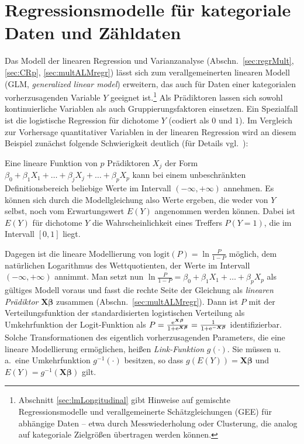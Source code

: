 \chapter{Regressionsmodelle für kategoriale Daten und Zähldaten}
\label{sec:glm}

Das Modell der linearen Regression und Varianzanalyse (Abschn.\ \ref{sec:regrMult}, \ref{sec:CRp}, \ref{sec:multALMregr}) lässt sich zum verallgemeinerten linearen Modell (GLM, \emph{generalized linear model}) erweitern, das auch für Daten einer kategorialen vorherzusagenden Variable $Y$ geeignet ist.\footnote{Abschnitt \ref{sec:lmLongitudinal} gibt Hinweise auf gemischte Regressionsmodelle und verallgemeinerte Schätzgleichungen (GEE) für abhängige Daten -- etwa durch Messwiederholung oder Clusterung, die analog auf kategoriale Zielgrößen übertragen werden können.} Als Prädiktoren lassen sich sowohl kontinuierliche Variablen als auch Gruppierungsfaktoren einsetzen. Ein Spezialfall ist die logistische Regression für dichotome $Y$ (codiert als $0$ und $1$). Im Vergleich zur Vorhersage quantitativer Variablen in der linearen Regression wird an diesem Beispiel zunächst folgende Schwierigkeit deutlich (für Details vgl.\ ):

Eine lineare Funktion von $p$ Prädiktoren $X_{j}$ der Form $\beta_{0} + \beta_{1} X_{1} + \dots + \beta_{j} X_{j} + \dots + \beta_{p} X_{p}$ kann bei einem unbeschränkten Definitionsbereich beliebige Werte im Intervall $(-{\infty}, +{\infty})$ annehmen. Es können sich durch die Modellgleichung also Werte ergeben, die weder von $Y$ selbst, noch vom Erwartungswert $E(Y)$ angenommen werden können. Dabei ist $E(Y)$ für dichotome $Y$ die Wahrscheinlichkeit eines Treffers $P(Y = 1)$, die im Intervall $[0, 1]$ liegt.

Dagegen ist die lineare Modellierung von $\text{logit}(P) = \ln \frac{P}{1-P}$ möglich, dem natürlichen Logarithmus des Wettquotienten, der Werte im Intervall $(-{\infty}, +{\infty})$ annimmt. Man setzt nun $\ln \frac{P}{1-P} = \beta_{0} + \beta_{1} X_{1} + \dots + \beta_{p} X_{p}$ als gültiges Modell voraus und fasst die rechte Seite der Gleichung als \emph{linearen Prädiktor} $\bm{X} \bm{\beta}$ zusammen (Abschn.\ \ref{sec:multALMregr}). Dann ist $P$ mit der Verteilungsfunktion der standardisierten logistischen Verteilung als Umkehrfunktion der Logit-Funktion als $P = \frac{{\mathrm{e}}^{\bm{X} \bm{\beta}}}{1+{\mathrm{e}}^{\bm{X} \bm{\beta}}} = \frac{1}{1+{\mathrm{e}}^{-\bm{X} \bm{\beta}}}$ identifizierbar. Solche Transformationen des eigentlich vorherzusagenden Parameters, die eine lineare Modellierung ermöglichen, heißen \emph{Link-Funktion} $g(\cdot)$. Sie müssen u.\,a.\ eine Umkehrfunktion $g^{-1}(\cdot)$ besitzen, so dass $g(E(Y)) = \bm{X} \bm{\beta}$ und $E(Y) = g^{-1}(\bm{X} \bm{\beta})$ gilt.

